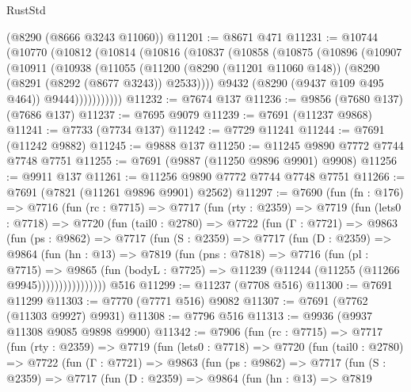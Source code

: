 \begin{lexlean}{RustStd}
\begin{coremodule}
    (@8290 (@8666 @3243 @11060))
@11201 := @8671 @471
@11231 := @10744
    (@10770
      (@10812
        (@10814
          (@10816
            (@10837
              (@10858
                (@10875
                  (@10896
                    (@10907
                      (@10911
                        (@10938
                          (@11055
                            (@11200
                              (@8290 (@11201 @11060 @148))
                              (@8290 (@8291 (@8292 (@8677 @3243)) @2533))))
                          @9432
                          (@8290 (@9437 @109 @495 @464))
                          @9444)))))))))))
@11232 := @7674 @137
@11236 := @9856 (@7680 @137) (@7686 @137)
@11237 := @7695 @9079
@11239 := @7691 (@11237 @9868)
@11241 := @7733 (@7734 @137)
@11242 := @7729 @11241
@11244 := @7691 (@11242 @9882)
@11245 := @9888 @137
@11250 := @11245 @9890 @7772 @7744 @7748 @7751
@11255 := @7691 (@9887 (@11250 @9896 @9901) @9908)
@11256 := @9911 @137
@11261 := @11256 @9890 @7772 @7744 @7748 @7751
@11266 := @7691 (@7821 (@11261 @9896 @9901) @2562)
@11297 := @7690
    (fun (fn : @176) =>
    @7716
      (fun (rc : @7715) =>
      @7717
        (fun (rty : @2359) =>
        @7719
          (fun (lets0 : @7718) =>
          @7720
            (fun (tail0 : @2780) =>
            @7722
              (fun (Γ : @7721) =>
              @9863
                (fun (ps : @9862) =>
                @7717
                  (fun (S : @2359) =>
                  @7717
                    (fun (D : @2359) =>
                    @9864
                      (fun (hn : @13) =>
                      @7819
                        (fun (pns : @7818) =>
                        @7716
                          (fun (pl : @7715) =>
                          @9865
                            (fun (bodyL : @7725) =>
                            @11239 (@11244 (@11255 (@11266 @9945))))))))))))))))
    @516
@11299 := @11237 (@7708 @516)
@11300 := @7691 @11299
@11303 := @7770 (@7771 @516) @9082
@11307 := @7691 (@7762 (@11303 @9927) @9931)
@11308 := @7796 @516
@11313 := @9936 (@9937 @11308 @9085 @9898 @9900)
@11342 := @7906
    (fun (rc : @7715) =>
    @7717
      (fun (rty : @2359) =>
      @7719
        (fun (lets0 : @7718) =>
        @7720
          (fun (tail0 : @2780) =>
          @7722
            (fun (Γ : @7721) =>
            @9863
              (fun (ps : @9862) =>
              @7717
                (fun (S : @2359) =>
                @7717
                  (fun (D : @2359) =>
                  @9864
                    (fun (hn : @13) =>
                    @7819

\end{coremodule}
\end{lexlean}

